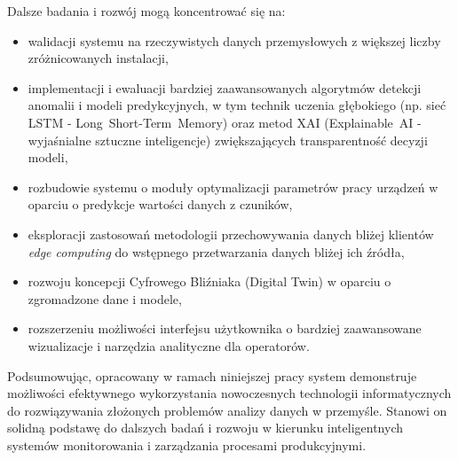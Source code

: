 \vspace{0.3em}

Dalsze badania i rozwój mogą koncentrować się na:
\begin{itemize}
    \item walidacji systemu na rzeczywistych danych przemysłowych z większej liczby zróżnicowanych instalacji,
    \item implementacji i ewaluacji bardziej zaawansowanych algorytmów detekcji anomalii i modeli predykcyjnych, w tym technik uczenia głębokiego (np. sieć LSTM - \mbox{Long Short-Term Memory}) oraz metod \mbox{XAI} (\mbox{Explainable AI} - wyjaśnialne sztuczne inteligencje) zwiększających transparentność decyzji modeli,
    \item rozbudowie systemu o moduły optymalizacji parametrów pracy urządzeń w oparciu o predykcje wartości danych z czuników,
    \item eksploracji zastosowań metodologii przechowywania danych bliżej klientów \textit{edge computing} do wstępnego przetwarzania danych bliżej ich źródła,
    \item rozwoju koncepcji Cyfrowego Bliźniaka (Digital Twin) w oparciu o zgromadzone dane i modele,
    \item rozszerzeniu możliwości interfejsu użytkownika o bardziej zaawansowane wizualizacje i narzędzia analityczne dla operatorów.
\end{itemize}

\vspace{0.3em}

Podsumowując, opracowany w ramach niniejszej pracy system demonstruje możliwości efektywnego wykorzystania nowoczesnych technologii informatycznych do rozwiązywania złożonych problemów analizy danych w przemyśle. Stanowi on solidną podstawę do dalszych badań i rozwoju w kierunku inteligentnych systemów monitorowania i zarządzania procesami produkcyjnymi. 